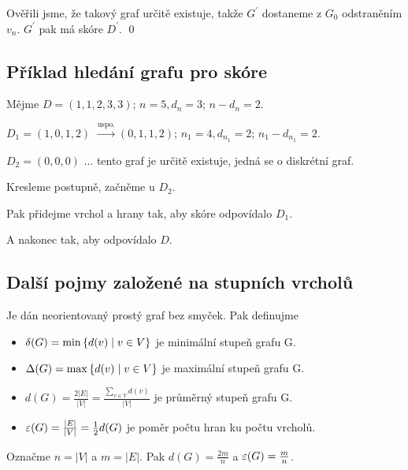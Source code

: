 Ověřili jsme, že takový graf určitě existuje, takže $G^\prime$ dostaneme z $G_0$ odstraněním $v_n$. $G^\prime$ pak má 
skóre $D^\prime$. \qed

\subsection{Příklad hledání grafu pro skóre}
Mějme $D = (1,1,2,3,3)$; $n=5, d_n=3$; $n-d_n=2$.

$D_1 = (1,0,1,2)$ $\overset{\text{uspo.}}{\rightarrow} (0,1,1,2)$; $n_1=4, d_{n_1} = 2$; $n_1 - d_{n_1}=2$.

$D_2 = (0, 0, 0)$ $\dots$ tento graf je určitě existuje, jedná se o diskrétní graf.

Kresleme postupně, začněme u $D_2$.
\begin{figure}[H]
\end{figure}
Pak přidejme vrchol a hrany tak, aby skóre odpovídalo $D_1$.
\begin{figure}[H]
\end{figure}
A nakonec tak, aby odpovídalo $D$.
\begin{figure}[H]
\end{figure}

\subsection{Další pojmy založené na stupních vrcholů}
 Je dán neorientovaný prostý graf bez smyček. Pak definujme
\begin{itemize}
    \item $\delta(G) = \min\left\lbrace d(v) \mid v \in V \right\rbrace$ je minimální stupeň grafu G.
    \item $\Delta(G) = \max\left\lbrace d(v) \mid v \in V \right\rbrace$ je maximální stupeň grafu G.
    \item $d(G) = \frac{2|E|}{|V|} = \frac{\sum_{v \in V} d(v)}{|V|}$ je průměrný stupeň grafu G.
    \item $\varepsilon(G) = \frac{|E|}{|V|} = \frac{1}{2}d(G)$ je poměr počtu hran ku počtu vrcholů.
\end{itemize}
Označme $n = |V|$ a $m = |E|$. Pak $d(G) = \frac{2m}{n}$ a $\varepsilon(G) = \frac{m}{n}$. 


